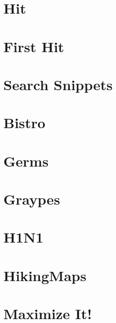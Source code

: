 \documentclass[a4paper, 10pt]{article}
\let\stdsection\section
\renewcommand\section{\newpage\stdsection}
\newcommand{\includecode}[1]{
    }
\begin{document}
    \section{Hit}
        \includecode{../problems/w06/Hit/Hit1.cpp}
        
    \section{First Hit}
        \includecode{../problems/w06/FirstHit/FirstHit1.cpp}
    
    \section{Search Snippets}
        \includecode{../problems/w06/Search_Snippets/SearchSnippets1.cpp}
              
    
    \section{Bistro}
        \includecode{../problems/w07/Bistro/Bistro1.cpp}
        
    \section{Germs}
        \includecode{../problems/w07/Germs/Germs1.cpp}
        
    \section{Graypes}
        \includecode{../problems/w07/Graypes/Graypes1.cpp}
        
    \section{H1N1}
        \includecode{../problems/w07/H1N1/H1N1_1.cpp}
    
    \section{HikingMaps}
        \includecode{../problems/w07/HikingMaps/HikingMaps1.cpp}
    
    
    \section{Maximize It!}
        \includecode{../problems/w08/Maximize_It/MaximizeIt1.cpp}
        
\end{document}
